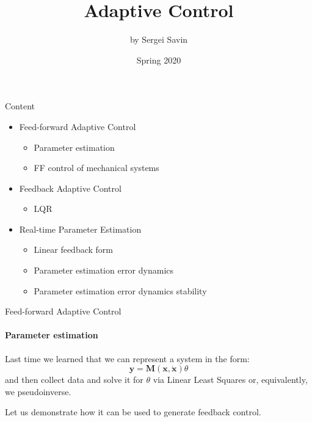 \documentclass{beamer}
\title{Adaptive Control}
\author{by Sergei Savin}
\date{Spring 2020}
\begin{document}
\maketitle


\begin{frame}{Content}
\begin{itemize}
\item Feed-forward Adaptive Control
\begin{itemize}
\item Parameter estimation
\item FF control of mechanical systems
\end{itemize}
\item Feedback Adaptive Control
\begin{itemize}
\item LQR
\end{itemize}
\item Real-time Parameter Estimation
\begin{itemize}
\item Linear feedback form
\item Parameter estimation error dynamics
\item Parameter estimation error dynamics stability
\end{itemize}
\end{itemize}


\end{frame}

\begin{frame}{Feed-forward Adaptive Control}
\framesubtitle{Parameter estimation}
\begin{flushleft}

Last time we learned that we can represent a system in the form:
%
\[
\mathbf y = \mathbf M (\mathbf x, \dot {\mathbf x}) \theta
\]
%
and then collect data and solve it for $\theta$ via Linear Least Squares or, equivalently, we pseudoinverse. 

\bigskip

Let us demonstrate how it can be used to generate feedback control.

\end{flushleft}
\end{frame}
\end{document}
